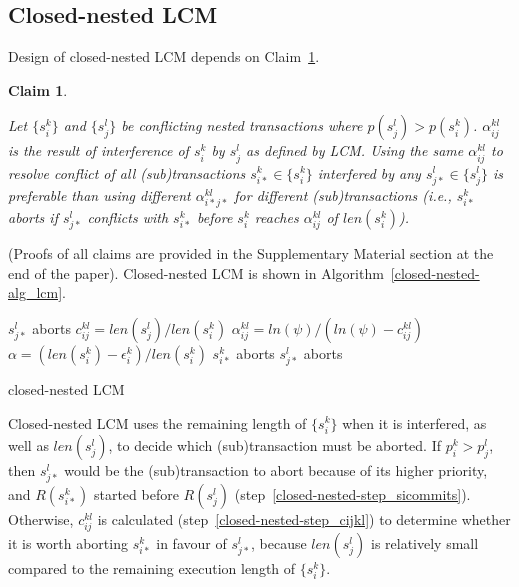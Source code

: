 \documentclass[letter]{sig-alternate}
\newtheorem{clm}{Claim}
\begin{document}
\subsection{Closed-nested LCM}\label{sec:closed_nested_lcm}

Design of closed-nested LCM depends on Claim~\ref{closed_nesting_fblt_one_alpha}.

\begin{clm}\label{closed_nesting_fblt_one_alpha}

Let $\{s_{i}^{k}\}$ and $\{s_{j}^{l}\}$ be conflicting nested transactions where $p(s_{j}^{l})>p(s_{i}^{k})$. $\alpha_{ij}^{kl}$ is the result of interference of $s_{i}^{k}$ by $s_{j}^{l}$ as defined by LCM. Using the same $\alpha_{ij}^{kl}$ to resolve conflict of
all (sub)transactions $s_{i*}^{k}\in\{s_{i}^{k}\}$ interfered by
any $s_{j*}^{l}\in\{s_{j}^{l}\}$ is preferable than using different
$\alpha_{i*j*}^{kl}$ for different (sub)transactions (i.e., $s_{i*}^{k}$
aborts if $s_{j*}^{l}$ conflicts with $s_{i*}^{k}$ before $s_{i}^{k}$
reaches $\alpha_{ij}^{kl}$ of $len(s_{i}^{k})$).

\end{clm}
(Proofs of all claims are provided in the Supplementary Material section at the end of the paper). Closed-nested LCM is shown in Algorithm~\ref{closed-nested-alg_lcm}. 
%
\begin{algorithm}[!htpd]
\footnotesize{
\LinesNumbered
{}
	{$s_{j*}^l$ aborts\label{closed-nested-step_sicommits}\;}
	{$c_{ij}^{kl}=len(s_j^l)/len(s_i^k)$\label{closed-nested-step_cijkl}\;
	$\alpha_{ij}^{kl}=ln(\psi)/(ln(\psi)-c_{ij}^{kl})$\label{closed-nested-step_alphaijkl}\;
	$\alpha=\left(len(s_i^k)-\epsilon_i^k\right)/len(s_i^k)$\;
	{$s_{i*}^k$ aborts\label{closed-nested-step_siaborts}\;}
	{$s_{j*}^l$ aborts\label{closed-nested-step_sjaborts}\;}
	}
	}
\caption{closed-nested LCM}
\label{closed-nested-alg_lcm}
\end{algorithm}
%
Closed-nested LCM uses the remaining length of $\{s_{i}^{k}\}$ when it is interfered,
as well as $len(s_{j}^{l})$, to decide which (sub)transaction must be aborted. If $p_i^k > p_j^l$, then $s_{j*}^l$ would be the (sub)transaction to abort because of its higher priority, and $R(s_{i*}^k)$ started before $R(s_j^l)$ (step~\ref{closed-nested-step_sicommits}). Otherwise, $c_{ij}^{kl}$ is calculated (step~\ref{closed-nested-step_cijkl}) to determine whether it is worth aborting $s_{i*}^k$ in favour of $s_{j*}^l$, because $len(s_j^l)$ is relatively small compared to the remaining execution length of $\{s_i^k\}$.
\end{document}
